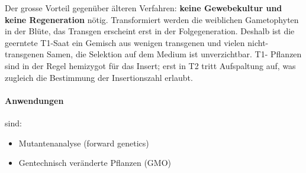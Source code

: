 \begin{bem}
    Der grosse Vorteil gegenüber älteren Verfahren: \textbf{keine Gewebekultur und
    keine Regeneration} nötig.
    Transformiert werden die weiblichen
    Gametophyten in der Blüte, das Transgen erscheint erst in der Folgegeneration.
    Deshalb ist die geerntete T1-Saat ein Gemisch aus wenigen transgenen und vielen
    nicht-transgenen Samen, die Selektion auf dem Medium ist unverzichtbar.
    T1- Pflanzen sind in der Regel hemizygot für das Insert; erst in T2 tritt
    Aufspaltung auf, was zugleich die Bestimmung der Insertionszahl erlaubt.
\end{bem}


\paragraph{Anwendungen} sind:
\begin{itemize}
    \item Mutantenanalyse (forward genetics)
    \item Gentechnisch veränderte Pflanzen (GMO)
\end{itemize}

